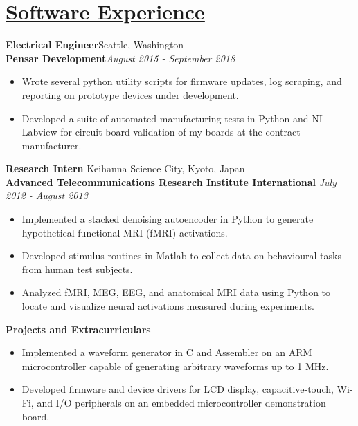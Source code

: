\documentclass[a4paper, 11pt]{article}
\begin{document}
\section{\underline{Software Experience}}
  \textbf{Electrical Engineer}\hfill Seattle, Washington\\
  \textbf{Pensar Development}\hfill \emph{August 2015 - September 2018}\smallskip
  \begin{itemize}[nosep]
    \item Wrote several python utility scripts for firmware updates, log scraping, and reporting on prototype devices under development.
    \item Developed a suite of automated manufacturing tests in Python and NI Labview for circuit-board validation of my boards at the contract manufacturer.
  \end{itemize}
  \medskip
  
  \textbf{Research Intern} \hfill Keihanna Science City, Kyoto, Japan \\
  \textbf{Advanced Telecommunications Research Institute International} \hfill \emph{July 2012 - August 2013}\smallskip
  \begin{itemize}[nosep]
    \item Implemented a stacked denoising autoencoder in Python to generate hypothetical functional MRI (fMRI) activations.
    \item Developed stimulus routines in Matlab to collect data on behavioural tasks from human test subjects.
    \item Analyzed fMRI, MEG, EEG, and anatomical MRI data using Python to locate and visualize neural activations measured during experiments.
  \end{itemize}
  \medskip

  \textbf{Projects and Extracurriculars}
  \begin{itemize}[nosep]
    \item Implemented a waveform generator in C and Assembler on an ARM microcontroller capable of generating arbitrary waveforms up to 1 MHz.
    \item Developed firmware and device drivers for LCD display, capacitive-touch, Wi-Fi, and I/O peripherals on an embedded microcontroller demonstration board.
  \end{itemize}
  
\end{document}
